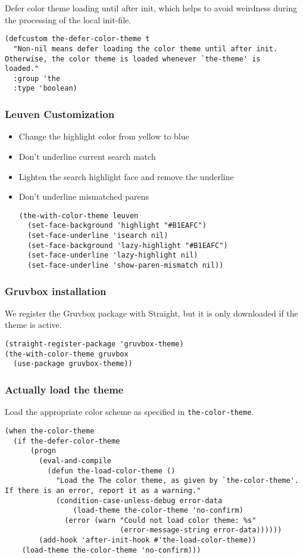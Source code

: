 \documentclass[11pt]{article}
\begin{document}
Defer color theme loading until after init, which helps to avoid
weirdness during the processing of the local init-file.

\begin{verbatim}
(defcustom the-defer-color-theme t
  "Non-nil means defer loading the color theme until after init.
Otherwise, the color theme is loaded whenever `the-theme' is
loaded."
  :group 'the
  :type 'boolean)
\end{verbatim}

\subsubsection{Leuven Customization}
\label{sec:org4d0fdd3}
\begin{itemize}
\item Change the highlight color from yellow to blue
\item Don't underline current search match
\item Lighten the search highlight face and remove the underline
\item Don't underline mismatched parens

\begin{verbatim}
(the-with-color-theme leuven
  (set-face-background 'highlight "#B1EAFC")
  (set-face-underline 'isearch nil)
  (set-face-background 'lazy-highlight "#B1EAFC")
  (set-face-underline 'lazy-highlight nil)
  (set-face-underline 'show-paren-mismatch nil))
\end{verbatim}
\end{itemize}

\subsubsection{Gruvbox installation}
\label{sec:org7996c24}
We register the Gruvbox package with Straight, but it is only
downloaded if the theme is active.
\begin{verbatim}
(straight-register-package 'gruvbox-theme)
(the-with-color-theme gruvbox
  (use-package gruvbox-theme))
\end{verbatim}

\subsubsection{Actually load the theme}
\label{sec:org41ca109}
Load the appropriate color scheme as specified in
\texttt{the-color-theme}.
\begin{verbatim}
(when the-color-theme
  (if the-defer-color-theme
      (progn
        (eval-and-compile
          (defun the-load-color-theme ()
            "Load the The color theme, as given by `the-color-theme'.
If there is an error, report it as a warning."
            (condition-case-unless-debug error-data
                (load-theme the-color-theme 'no-confirm)
              (error (warn "Could not load color theme: %s"
                           (error-message-string error-data))))))
        (add-hook 'after-init-hook #'the-load-color-theme))
    (load-theme the-color-theme 'no-confirm)))
\end{verbatim}
\end{document}
